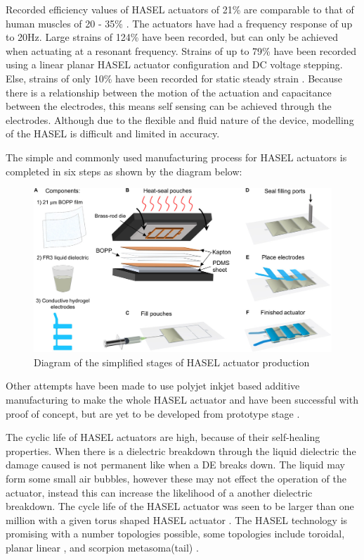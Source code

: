 Recorded efficiency values of HASEL actuators of 21\% are comparable to that of human muscles of 20 - 35\% \citep{Smith2005}. The actuators have had a frequency response of up to 20Hz. Large strains of 124\% have been recorded, but can only be achieved when actuating at a resonant frequency. Strains of up to 79\% have been recorded using a linear planar HASEL actuator configuration and DC voltage stepping.  Else, strains of only 10\% have been recorded for static steady strain \citep{Kellaris2018}.
Because there is a relationship between the motion of the actuation and capacitance between the electrodes, this means self sensing can be achieved through the electrodes. Although due to the flexible and fluid nature of the device, modelling of the HASEL is difficult and limited in accuracy.

The simple and commonly used manufacturing process for HASEL actuators is completed in six steps as shown by the diagram below:
\begin{figure}[H]
  \centering
  \includegraphics[width=0.7\linewidth]{Figures/HASEL_manuf.jpg}
  \caption{Diagram of the simplified stages of HASEL actuator production \citep{Kellaris2018}}
  \label{fig:Artificial Muscle_HASEL_manf}
\end{figure}

Other attempts have been made to use polyjet inkjet based additive manufacturing to make the whole HASEL actuator and have been successful with proof of concept, but are yet to be developed from prototype stage \citep{Manionn.d.}. 

The cyclic life of HASEL actuators are high, because of their self-healing properties. When there is a dielectric breakdown through the liquid dielectric the damage caused is not permanent like when a DE breaks down. The liquid may form some small air bubbles, however these may not effect the operation of the actuator, instead this can increase the likelihood of a another dielectric breakdown. The cycle life of the HASEL actuator was seen to be larger than one million with a given torus shaped HASEL actuator \citep{Acome2018}. The HASEL technology is promising with a number topologies possible, some topologies include toroidal, planar linear \citep{Acome2018}, and scorpion metasoma(tail) \citep{Mitchell2019}.

